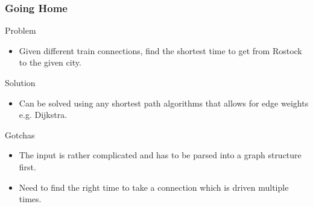 \documentclass{beamer}
\begin{document}
\begin{frame}
    \frametitle{Going Home}
    \begin{block}{Problem}
        \begin{itemize}
            \item Given different train connections, find the shortest time to get from Rostock to the given city.
        \end{itemize}
    \end{block} \pause
    \begin{block}{Solution}
        \begin{itemize}
            \item Can be solved using any shortest path algorithms that allows for edge weights e.g. Dijkstra.
        \end{itemize}
    \end{block} \pause
    \begin{block}{Gotchas}
        \begin{itemize}
            \item The input is rather complicated and has to be parsed into a graph structure first.
            \pause
            \item Need to find the right time to take a connection which is driven multiple times.
        \end{itemize}
    \end{block} 
\end{frame}
\end{document}
